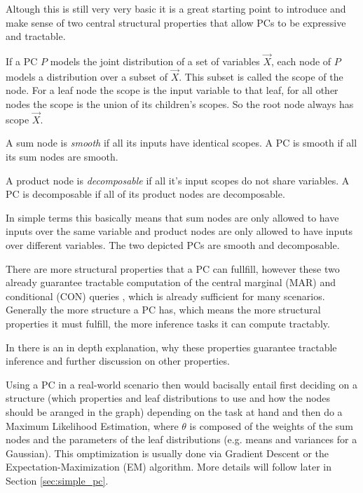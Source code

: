 Altough this is still very very basic it is a great starting point to introduce and make sense of two central structural 
properties that allow PCs to be expressive and tractable. 

\begin{definition}[Scope]
    If a PC $P$ models the joint distribution of a set of variables $\vec{X}$, each node of $P$ models a distribution over a subset of $\vec{X}$.
    This subset is called the scope of the node. For a leaf node the scope is the input variable to that leaf, for all other nodes the scope 
    is the union of its children's scopes. So the root node always has scope $\vec{X}$. \cite{pc_intro}
\end{definition}

\begin{definition}[Smoothness]
    A sum node is \textit{smooth} if all its inputs have identical scopes. A PC is smooth if all its sum nodes are smooth. \cite{pc_intro}
\end{definition}
\begin{definition}[Decomposability]
    A product node is \textit{decomposable} if all it's input scopes do not share variables. A PC is decomposable if all of its product nodes are decomposable. \cite{pc_intro}
\end{definition}

In simple terms this basically means that sum nodes are only allowed to have inputs over the same variable and product nodes are
only allowed to have inputs over different variables. The two depicted PCs are smooth and decomposable.

There are more structural properties that a PC can fullfill, however these two already guarantee tractable computation of the central
marginal (MAR) and conditional (CON) queries \cite{pc_intro}, which is already sufficient for many scenarios. 
Generally the more structure a PC has, which means the more structural properties it must fulfill, the more inference tasks it can compute 
tractably. 

In \cite{pc_intro} there is an in depth explanation, why these properties guarantee tractable inference 
and further discussion on other properties.

Using a PC in a real-world scenario then would bacisally entail first deciding on a structure (which properties and leaf 
distributions to use and how the nodes should be aranged in the graph) depending on the task at hand and then do a Maximum Likelihood 
Estimation, where $\theta$ is composed of the weights of the sum nodes and the parameters of the leaf distributions (e.g. means and variances for a Gaussian). 
This omptimization is usually done via Gradient Descent or the Expectation-Maximization (EM) algorithm. More details will follow later in Section \ref{sec:simple_pc}.

